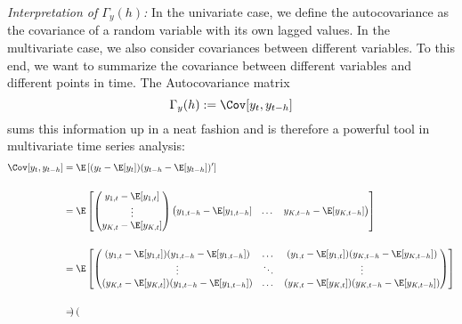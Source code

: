 \begin{enumerate}
\begin{sol}
              \emph{Interpretation of $\Gamma_y(h)$:} In the univariate case, we define the autocovariance as the covariance of a random variable with its own lagged values. In the multivariate case, we also consider covariances between different variables. To this end, we want to summarize the covariance between different variables and different points in time. The Autocovariance matrix \[ {\Gamma_y(h)} := \Cov[{y_{t},{y_{t-h}}}] \] sums this information up in a neat fashion and is therefore a powerful tool in multivariate time series analysis:
              \begin{align*}
                  \Cov[{y_{t}, {y_{t-h}}}]
                   & = \E\left[
                      ({y_{t}} - \E[{{y_{t}}}])
                      ({y_{t-h}} - \E[{{y_{t-h}}}])'
                      \right]
                  \\[0.5cm]
                   & = \E\left[
                      \begin{pmatrix}
                          y_{1,t} - \E[y_{1,t}]
                          \cr \vdots
                          \cr y_{K,t} - \E[y_{K,t}]
                      \end{pmatrix}
                      \begin{pmatrix}
                          y_{1,{t-h}} - \E[y_{1,{t-h}}]
                           & \dots
                           & y_{K,{t-h}} - \E[y_{K,{t-h}}]
                      \end{pmatrix}
                      \right]
                  \\[0.5cm]
                   & = \E\left[
                      \begin{pmatrix}
                          (y_{1,t}- \E[y_{1,t}])(y_{1,{t-h}} - \E[y_{1,{t-h}}])
                           & \dots
                           & (y_{1,t} - \E[y_{1,t}])(y_{K,{t-h}} - \E[y_{K,{t-h}}])
                          \\
                          \vdots
                           & \ddots
                           & \vdots
                          \\
                          (y_{K,t}- \E[y_{K,t}])(y_{1,{t-h}} - \E[y_{1,{t-h}}])
                           & \dots
                           & (y_{K,t} - \E[y_{K,t}])(y_{K,{t-h}} - \E[y_{K,{t-h}}])
                      \end{pmatrix}
                      \right]
                  \\[0.5cm]
                   & = \begin{pmatrix}

\end{pmatrix}
\end{align*}
\end{sol}
\end{enumerate}

